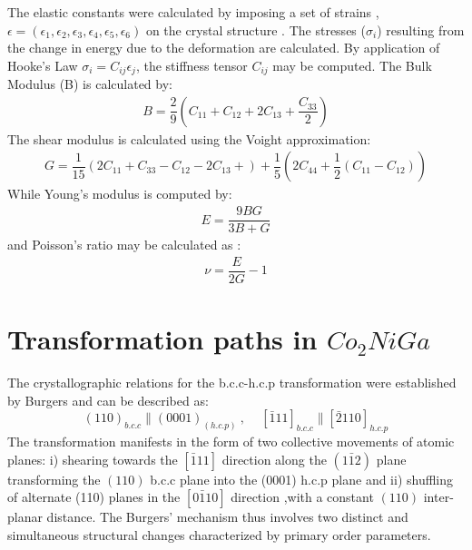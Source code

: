 \documentclass[%
preprint,
 amsmath,amssymb,
 aps,
prb,
showkeys,
]{revtex4-1}
\begin{document}
	The elastic constants were calculated by imposing a set of strains , 
	$\epsilon=( \epsilon_{1}, \epsilon_{2}, \epsilon_{3}, \epsilon_{4}, \epsilon_{5}, \epsilon_{6})$ 
	on the crystal structure \cite{ganeshan2009effect,ganeshan2009elastic,shang2010first,le2002symmetry,duong2011ab}. The stresses ($\sigma_{i}$) resulting from the change in energy due to the deformation are calculated. By application of  Hooke's Law $\sigma_{i}=C_{ij}\epsilon_{j} $, the stiffness tensor $C_{ij}$ may be computed.
	The Bulk Modulus (B) is calculated by\cite{duong2011ab}:
		\begin{align}
		B = \dfrac{2}{9}\left({C_{11}+C_{12}+ 2C_{13}+ \dfrac{C_{33}}{2}}\right) 
		\end{align}
	The shear modulus is calculated using the Voight approximation\cite{duong2011ab}:
		\begin{align}
		G = \dfrac{1}{15}\left(2C_{11} + C_{33} -C_{12} -2C_{13}+ \right) +
		\dfrac{1}{5} \left( 2C_{44} + \dfrac{1}{2} (C_{11}-C_{12})\right) 
		\end{align}
	While Young's modulus is computed by\cite{duong2011ab}:
		\begin{align}
		E = \dfrac{9BG}{3B+G}
		\end{align}
	and Poisson's ratio may be calculated as :
		\begin{align}
		\nu = \dfrac{E}{2G}-1
		\end{align}
\section{Transformation paths in \texorpdfstring{$Co_2NiGa$}{CO2NiGa} }
\label{Sec:transformations}

The crystallographic relations for the b.c.c-h.c.p transformation were established  by Burgers \cite{burger1934} and can be described as:
\begin{equation}
(110)_{b.c.c} \parallel (0 0 0 1)_{(h.c.p)} \ , \ \ \ \ \;[\bar{1}  1  1]_{b.c.c} \parallel [\bar{2}  1  1  0]_{h.c.p}
\end{equation}
The transformation manifests in the form of two collective movements of atomic planes:
 i) shearing towards the $[\bar{1} 1 1]$ direction along the $(1\bar{1}2)$  plane transforming the $(110)$ b.c.c plane into the (0001) h.c.p plane and ii) shuffling of alternate (110) planes
in the $[0\bar{1} 1 0]$ direction ,with a  constant $(110)$ inter-planar distance.
The Burgers' mechanism thus involves two distinct and simultaneous structural changes characterized by primary order parameters.
\end{document}
